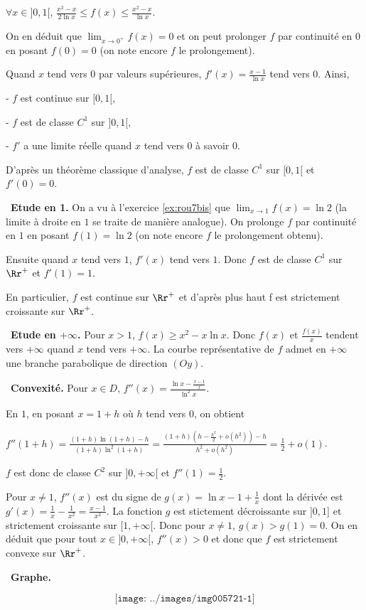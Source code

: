 {{\begin{center}
$\forall x\in]0,1[$,  $\frac{x^2-x}{2\ln x}\leqslant f(x)\leqslant\frac{x^2-x}{\ln x}$.
\end{center}

On en déduit que $\lim_{x \rightarrow 0^+}f(x) = 0$ et on peut prolonger $f$ par continuité en $0$ en posant $f(0) = 0$ (on note encore $f$ le prolongement).

Quand $x$ tend vers $0$ par valeurs supérieures, $f'(x) =\frac{x-1}{\ln x}$  tend vers 0. Ainsi,

- $f$ est continue sur $[0,1[$,

- $f$ est de classe $C^1$ sur $]0,1[$,

- $f'$ a une limite réelle quand $x$ tend vers $0$ à savoir $0$.

D'après un théorème classique d'analyse, $f$ est de classe $C^1$ sur $[0,1[$ et $f'(0) = 0$.

 \textbullet~\textbf{Etude en 1.} On a vu à l'exercice \ref{ex:rou7bis} que $\lim_{x \rightarrow 1}f(x)=\ln2$ (la limite à droite en $1$ se traite de manière analogue). On prolonge $f$ par continuité en $1$ en posant $f(1) =\ln2$ (on note encore $f$ le prolongement obtenu).
 

Ensuite quand $x$ tend vers $1$, $f'(x)$ tend vers $1$. Donc $f$ est de classe $C^1$ sur $\Rr^+$ et $f'(1)=1$.

En particulier, $f$ est continue sur $\Rr^+$ et d'après plus haut f est strictement croissante sur $\Rr^+$.

 \textbullet~\textbf{Etude en $+\infty$.} Pour  $x > 1$, $f(x)\geqslant{x^2-x}{\ln x}$. Donc $f(x)$ et $\frac{f(x)}{x}$ tendent vers $+\infty$  quand $x$ tend vers $+\infty$.
La courbe représentative de $f$ admet en $+\infty$ une branche parabolique de direction $(Oy)$.

 \textbullet~\textbf{Convexité.} Pour $x\in D$, $f''(x)=\frac{\ln x-\frac{x-1}{x}}{\ln^2x}$.
 

En $1$, en posant $x = 1+h$ où $h$ tend vers $0$, on obtient

\begin{center}
$f''(1+h)=\frac{(1+h)\ln(1+h)-h}{(1+h)\ln^2(1+h)}=\frac{(1+h)\left(h-\frac{h^2}{2}+o(h^2)\right)-h}{h^2+o(h^2)}=\frac{1}{2}+o(1)$.
\end{center}

$f$ est donc de classe $C^2$ sur $]0,+\infty[$ et $f''(1) =\frac{1}{2}$.

Pour $x\neq 1$, $f''(x)$  est du signe de $g(x)=\ln x - 1 +\frac{1}{x}$ dont la dérivée est $g'(x)=\frac{1}{x}-\frac{1}{x^2}=\frac{x-1}{x^2}$. La fonction $g$ est stictement décroissante sur $]0,1]$ et strictement croissante sur $[1,+\infty[$. Donc pour $x\neq1$, $g(x)> g(1) = 0$. On en déduit que pour tout $x\in]0,+\infty[$, $f''(x) > 0$ et donc que $f$ est strictement convexe sur $\Rr^+$.

\textbullet~\textbf{Graphe.}

$$\texttt{[image: ../images/img005721-1]}$$
}
}

